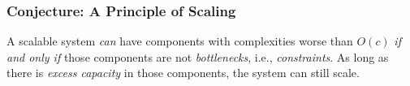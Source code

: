 \subsubsection{Conjecture: A Principle of Scaling}

\label{sec:a-principle-of-scaling}

A scalable system \emph{can} have components with complexities worse than $O(c)$ \emph{if and only if} those components are not \emph{bottlenecks}, i.e., \emph{constraints}.
As long as there is \emph{excess capacity} in those components, the system can still scale.

\SetToCDepthDefault
